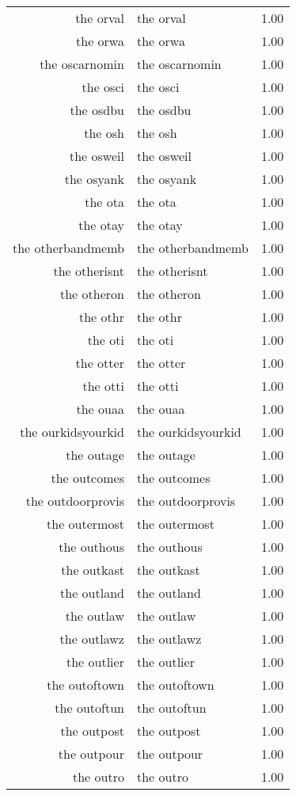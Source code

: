 \begin{table}[ht]
\begin{tabular}{rlr}
  the orval & the orval & 1.00 \\ 
  the orwa & the orwa & 1.00 \\ 
  the oscarnomin & the oscarnomin & 1.00 \\ 
  the osci & the osci & 1.00 \\ 
  the osdbu & the osdbu & 1.00 \\ 
  the osh & the osh & 1.00 \\ 
  the osweil & the osweil & 1.00 \\ 
  the osyank & the osyank & 1.00 \\ 
  the ota & the ota & 1.00 \\ 
  the otay & the otay & 1.00 \\ 
  the otherbandmemb & the otherbandmemb & 1.00 \\ 
  the otherisnt & the otherisnt & 1.00 \\ 
  the otheron & the otheron & 1.00 \\ 
  the othr & the othr & 1.00 \\ 
  the oti & the oti & 1.00 \\ 
  the otter & the otter & 1.00 \\ 
  the otti & the otti & 1.00 \\ 
  the ouaa & the ouaa & 1.00 \\ 
  the ourkidsyourkid & the ourkidsyourkid & 1.00 \\ 
  the outage & the outage & 1.00 \\ 
  the outcomes & the outcomes & 1.00 \\ 
  the outdoorprovis & the outdoorprovis & 1.00 \\ 
  the outermost & the outermost & 1.00 \\ 
  the outhous & the outhous & 1.00 \\ 
  the outkast & the outkast & 1.00 \\ 
  the outland & the outland & 1.00 \\ 
  the outlaw & the outlaw & 1.00 \\ 
  the outlawz & the outlawz & 1.00 \\ 
  the outlier & the outlier & 1.00 \\ 
  the outoftown & the outoftown & 1.00 \\ 
  the outoftun & the outoftun & 1.00 \\ 
  the outpost & the outpost & 1.00 \\ 
  the outpour & the outpour & 1.00 \\ 
  the outro & the outro & 1.00 \\ 

\end{tabular}
\end{table}
